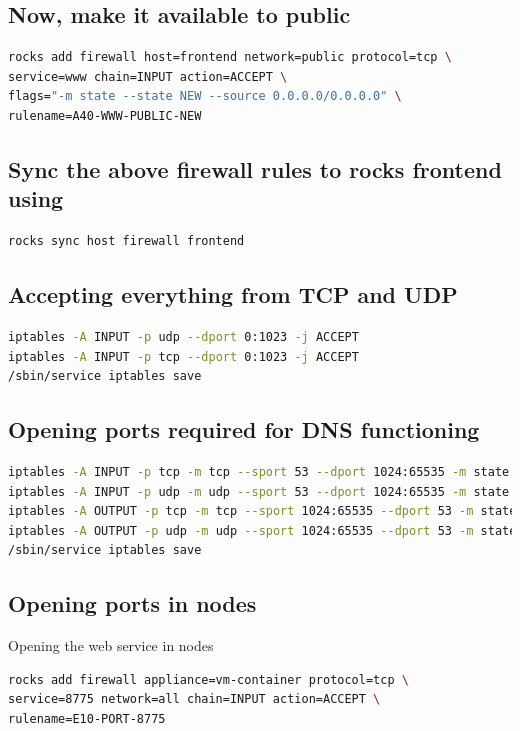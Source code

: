 \subsection{Now, make it available to public}
\begin{lstlisting}[language=bash]
rocks add firewall host=frontend network=public protocol=tcp \
service=www chain=INPUT action=ACCEPT \
flags="-m state --state NEW --source 0.0.0.0/0.0.0.0" \
rulename=A40-WWW-PUBLIC-NEW
\end{lstlisting}
\subsection{Sync the above firewall rules to rocks frontend using }
\begin{lstlisting}[language=bash]
rocks sync host firewall frontend
\end{lstlisting}
\subsection{Accepting everything from TCP and UDP }
\begin{lstlisting}[language=bash]
iptables -A INPUT -p udp --dport 0:1023 -j ACCEPT
iptables -A INPUT -p tcp --dport 0:1023 -j ACCEPT
/sbin/service iptables save
\end{lstlisting}
\subsection{Opening ports required for DNS functioning}

\begin{lstlisting}[language=bash]
iptables -A INPUT -p tcp -m tcp --sport 53 --dport 1024:65535 -m state \ --state ESTABLISHED -j ACCEPT
iptables -A INPUT -p udp -m udp --sport 53 --dport 1024:65535 -m state \ --state ESTABLISHED -j ACCEPT
iptables -A OUTPUT -p tcp -m tcp --sport 1024:65535 --dport 53 -m state \ --state NEW,ESTABLISHED -j ACCEPT
iptables -A OUTPUT -p udp -m udp --sport 1024:65535 --dport 53 -m state \ --state NEW,ESTABLISHED -j ACCEPT
/sbin/service iptables save

\end{lstlisting}
\subsection{Opening ports in nodes}
Opening the web service in nodes
\begin{lstlisting}[language=bash]
rocks add firewall appliance=vm-container protocol=tcp \
service=8775 network=all chain=INPUT action=ACCEPT \
rulename=E10-PORT-8775
\end{lstlisting}
